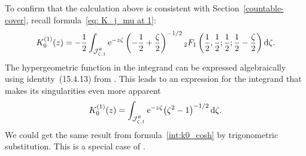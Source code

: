 \documentclass[10pt,a4paper]{amsart}
\numberwithin{equation}{section}
\begin{document}
To confirm that the calculation above is consistent with Section~\ref{countable-cover}, recall formula~\eqref{eq: K_j_mu at 1}:
\[ K_0^{(1)}(z) = -\frac{1}{2} \int_{\mathcal{J}^\theta_{\zeta, 1}} {\rm e}^{-z\zeta} \left(-\frac{1}{2}+\frac{\zeta}{2}\right)^{-1/2} {}_2F_1\left(\frac{1}{2}, \frac{1}{2}; \frac{1}{2}; \frac{1}{2} - \frac{\zeta}{2}\right) {\rm d}\zeta. \]
The hypergeometric function in the integrand can be expressed algebraically using identi\-ty~(15.4.13) from \cite{dlmf}. This leads to an expression for the integrand that makes its  singularities even more apparent
\[%
K_0^{(1)}(z) = \int_{\mathcal{J}^\theta_{\zeta, 1}} {\rm e}^{-z\zeta} \bigl(\zeta^2 - 1\bigr)^{-1/2}\, {\rm d}\zeta.
\]
We could get the same result from formula~\eqref{int:k0_cosh} by trigonometric substitution. This is a special case of \cite[formula~(10.32.8)]{dlmf}.
%
\end{document}
